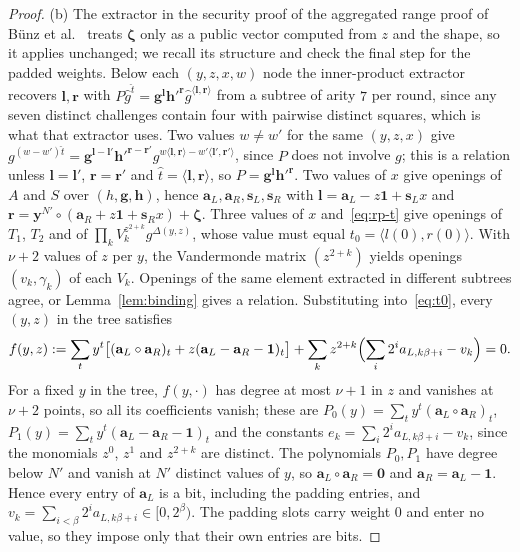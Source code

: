 \documentclass[11pt]{article}
\theoremstyle{definition}
\theoremstyle{remark}
\newcommand{\bv}{\mathbf}
\newcommand{\one}{\mathbf 1}
\begin{document}
\begin{proof}
(b) The extractor in the security proof of the aggregated range proof of Bünz et al.~\cite{bulletproofs} treats $\boldsymbol\zeta$ only as a public vector computed from $z$ and the shape, so it applies unchanged; we recall its structure and check the final step for the padded weights. Below each $(y,z,x,w)$ node the inner-product extractor recovers $\bv l,\bv r$ with $P\hat g^{\hat t}=\bv g^{\bv l}\bv h'^{\bv r}\hat g^{\langle\bv l,\bv r\rangle}$ from a subtree of arity $7$ per round, since any seven distinct challenges contain four with pairwise distinct squares, which is what that extractor uses. Two values $w\ne w'$ for the same $(y,z,x)$ give $g^{(w-w')\hat t}=\bv g^{\bv l-\bv l'}\bv h'^{\bv r-\bv r'}g^{w\langle\bv l,\bv r\rangle-w'\langle\bv l',\bv r'\rangle}$, since $P$ does not involve $g$; this is a relation unless $\bv l=\bv l'$, $\bv r=\bv r'$ and $\hat t=\langle\bv l,\bv r\rangle$, so $P=\bv g^{\bv l}\bv h'^{\bv r}$. Two values of $x$ give openings of $A$ and $S$ over $(h,\bv g,\bv h)$, hence $\bv a_L,\bv a_R,\bv s_L,\bv s_R$ with $\bv l=\bv a_L-z\one+\bv s_Lx$ and $\bv r=\bv y^{N'}\circ(\bv a_R+z\one+\bv s_Rx)+\boldsymbol\zeta$. Three values of $x$ and~\eqref{eq:rp-t} give openings of $T_1$, $T_2$ and of $\prod_kV_k^{z^{2+k}}g^{\Delta(y,z)}$, whose value must equal $t_0=\langle l(0),r(0)\rangle$. With $\nu+2$ values of $z$ per $y$, the Vandermonde matrix $(z^{2+k})$ yields openings $(v_k,\gamma_k)$ of each $V_k$. Openings of the same element extracted in different subtrees agree, or Lemma~\ref{lem:binding} gives a relation. Substituting into~\eqref{eq:t0}, every $(y,z)$ in the tree satisfies
\[
  f(y,z):=\sum_ty^t\bigl[(\bv a_L\circ\bv a_R)_t+z(\bv a_L-\bv a_R-\one)_t\bigr]+\sum_kz^{2+k}\Bigl(\sum_i2^ia_{L,k\beta+i}-v_k\Bigr)=0.
\]
For a fixed $y$ in the tree, $f(y,\cdot)$ has degree at most $\nu+1$ in $z$ and vanishes at $\nu+2$ points, so all its coefficients vanish; these are $P_0(y)=\sum_ty^t(\bv a_L\circ\bv a_R)_t$, $P_1(y)=\sum_ty^t(\bv a_L-\bv a_R-\one)_t$ and the constants $e_k=\sum_i2^ia_{L,k\beta+i}-v_k$, since the monomials $z^0$, $z^1$ and $z^{2+k}$ are distinct. The polynomials $P_0,P_1$ have degree below $N'$ and vanish at $N'$ distinct values of $y$, so $\bv a_L\circ\bv a_R=\bv0$ and $\bv a_R=\bv a_L-\one$. Hence every entry of $\bv a_L$ is a bit, including the padding entries, and $v_k=\sum_{i<\beta}2^ia_{L,k\beta+i}\in[0,2^\beta)$. The padding slots carry weight $0$ and enter no value, so they impose only that their own entries are bits.


\end{proof}
\end{document}
